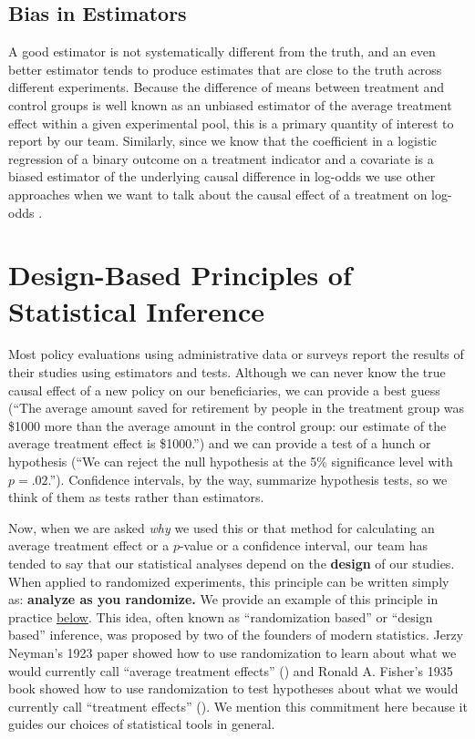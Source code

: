 \documentclass[
  12pt,
]{book}
\theoremstyle{definition}
\theoremstyle{definition}
\theoremstyle{definition}
\theoremstyle{remark}
\begin{document}
\hypertarget{bias-in-estimators}{%
\section{Bias in Estimators}\label{bias-in-estimators}}

A good estimator is not systematically different from the truth, and an
even better estimator tends to produce estimates that are close to the
truth across different experiments. Because the difference of means
between treatment and control groups is well known as an unbiased
estimator of the average treatment effect within a given experimental
pool, this is a primary quantity of interest to report by our team.
Similarly, since we know that the coefficient in a logistic regression
of a binary outcome on a treatment indicator and a covariate is a biased
estimator of the underlying causal difference in log-odds we use other
approaches when we want to talk about the causal effect of a treatment
on log-odds \citep{freedman2008randomization}.

\hypertarget{design-based-principles-of-statistical-inference}{%
\chapter{Design-Based Principles of Statistical
Inference}\label{design-based-principles-of-statistical-inference}}

Most policy evaluations using administrative data or surveys report the
results of their studies using estimators and tests. Although we can
never know the true causal effect of a new policy on our beneficiaries,
we can provide a best guess (``The average amount saved for retirement
by people in the treatment group was \$1000 more than the average amount
in the control group: our estimate of the average treatment effect is
\$1000.'') and we can provide a test of a hunch or hypothesis (``We can
reject the null hypothesis at the 5\% significance level with
\(p=.02\).''). Confidence intervals, by the way, summarize hypothesis
tests, so we think of them as tests rather than estimators.

Now, when we are asked \emph{why} we used this or that method for
calculating an average treatment effect or a \(p\)-value or a confidence
interval, our team has tended to say that our statistical analyses
depend on the \textbf{design} of our studies. When applied to randomized
experiments, this principle can be written simply as: \textbf{analyze as
you randomize.} We provide an example of this principle in practice
\protect\hyperlink{randinfex}{below}. This idea, often known as
``randomization based'' or ``design based'' inference, was proposed by
two of the founders of modern statistics. Jerzy Neyman's 1923 paper
showed how to use randomization to learn about what we would currently
call ``average treatment effects'' (\citet{neyman_application_1923}) and
Ronald A. Fisher's 1935 book showed how to use randomization to test
hypotheses about what we would currently call ``treatment effects''
(\citet{fisher_design_1935}). We mention this commitment here because it
guides our choices of statistical tools in general.
\end{document}
